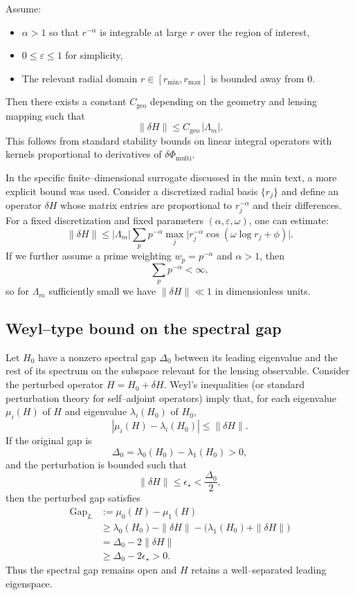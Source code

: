 \documentclass[11pt]{article}
\begin{document}
Assume:
\begin{itemize}[leftmargin=*]
  \item $\alpha>1$ so that $r^{-\alpha}$ is integrable at large $r$ over the region of interest,
  \item $0\leq\varepsilon\leq 1$ for simplicity,
  \item The relevant radial domain $r\in[r_{\min},r_{\max}]$ is bounded away from $0$.
\end{itemize}
Then there exists a constant $C_{\text{geo}}$ depending on the geometry and lensing mapping such that
\begin{equation}
\|\delta H\| \leq C_{\text{geo}}\, |\Lambda_m|.
\end{equation}
This follows from standard stability bounds on linear integral operators with kernels proportional to derivatives of $\delta\Phi_{\text{multi}}$.

In the specific finite--dimensional surrogate discussed in the main text, a more explicit bound was used. Consider a discretized radial basis $\{r_j\}$ and define an operator $\delta H$ whose matrix entries are proportional to $r_j^{-\alpha}$ and their differences. For a fixed discretization and fixed parameters $(\alpha,\varepsilon,\omega)$, one can estimate:
\begin{equation}
\|\delta H\| \leq |\Lambda_m| \sum_{p} p^{-\alpha} \max_j \big|r_j^{-\alpha} \cos(\omega\log r_j + \phi)\big|.
\end{equation}
If we further assume a prime weighting $w_p = p^{-\alpha}$ and $\alpha>1$, then
\[
\sum_{p} p^{-\alpha} < \infty,
\]
so for $\Lambda_m$ sufficiently small we have $\|\delta H\|\ll 1$ in dimensionless units.

\subsection{Weyl--type bound on the spectral gap}

Let $H_0$ have a nonzero spectral gap $\Delta_0$ between its leading eigenvalue and the rest of its spectrum on the subspace relevant for the lensing observable. Consider the perturbed operator $H = H_0 + \delta H$. Weyl's inequalities (or standard perturbation theory for self--adjoint operators) imply that, for each eigenvalue $\mu_i(H)$ of $H$ and eigenvalue $\lambda_i(H_0)$ of $H_0$,
\begin{equation}
|\mu_i(H) - \lambda_i(H_0)| \leq \|\delta H\|.
\end{equation}
If the original gap is
\[
\Delta_0 = \lambda_0(H_0) - \lambda_1(H_0) > 0,
\]
and the perturbation is bounded such that
\[
\|\delta H\| \leq \epsilon_\star < \frac{\Delta_0}{2},
\]
then the perturbed gap satisfies
\begin{align}
\mathrm{Gap}_L
&:= \mu_0(H) - \mu_1(H) \\
&\geq \lambda_0(H_0) - \|\delta H\| - \big(\lambda_1(H_0) + \|\delta H\|\big)\\
&= \Delta_0 - 2\|\delta H\| \\
&\geq \Delta_0 - 2\epsilon_\star > 0.
\end{align}
Thus the spectral gap remains open and $H$ retains a well--separated leading eigenspace.
\end{document}
